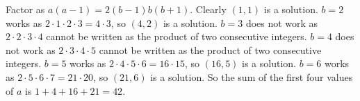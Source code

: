 Factor as $a\left(a-1\right)=2\left(b-1\right)b\left(b+1\right)$. Clearly $\left(1,1\right)$ is a solution. $b=2$ works as $2\cdot1\cdot2\cdot3=4\cdot3$, so $\left(4,2\right)$ is a solution. $b=3$ does not work as $2\cdot2\cdot3\cdot4$ cannot be written as the product of two consecutive integers. $b=4$ does not work as $2\cdot3\cdot4\cdot5$ cannot be written as the product of two consecutive integers. $b=5$ works as $2\cdot4\cdot5\cdot6=16\cdot15$, so $\left(16,5\right)$ is a solution. $b=6$ works as $2\cdot5\cdot6\cdot7=21\cdot20$, so $\left(21,6\right)$ is a solution. So the sum of the first four values of $a$ is $1+4+16+21=\boxed{42}$.